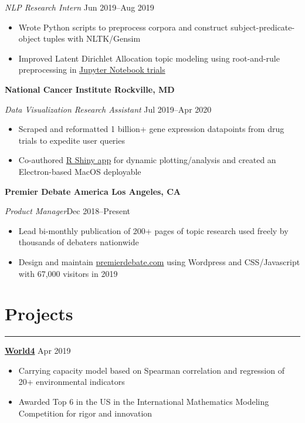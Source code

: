\documentclass[11pt]{article}
\newcommand{\resumesection}[1]{\vspace{-0.3cm}\section*{\color{highlight}#1}\vspace{-0.3cm}\hrule\vspace{0.3cm}}
\begin{document}
\textit{NLP Research Intern} \hfill Jun 2019--Aug 2019
\begin{itemize}
	\item Wrote Python scripts to preprocess corpora and construct subject-predicate-object tuples with NLTK/Gensim
	\item Improved Latent Dirichlet Allocation topic modeling using root-and-rule preprocessing in \href{https://github.com/petezh/RR-NLP-Tools}{Jupyter Notebook trials}
\end{itemize}\vspace{0.1cm}

\textbf{National Cancer Institute \hfill Rockville, MD}\par

\textit{Data Visualization Research Assistant} \hfill Jul 2019--Apr 2020 \par
\begin{itemize}
	\item Scraped and reformatted 1 billion+ gene expression datapoints from drug trials to expedite user queries
	\item Co-authored \href{https://github.com/petezh/TP-Workbench}{R Shiny app} for dynamic plotting/analysis and created an Electron-based MacOS deployable
\end{itemize}

\textbf{Premier Debate America \hfill Los Angeles, CA} \par

\textit{Product Manager}\hfill Dec 2018--Present
\begin{itemize}
	\item Lead bi-monthly publication of 200+ pages of topic research used freely by thousands of debaters nationwide
	\item Design and maintain \href{https://www.premierdebate.com/briefs/}{premierdebate.com} using Wordpress and CSS/Javascript with 67,000 visitors in 2019
\end{itemize}\vspace{0.1cm}


\resumesection{Projects}

\textbf{\href{https://github.com/gautomdas/IMMC-World4/blob/master/US-9365.pdf}{World4}} \hfill Apr 2019\par
\begin{itemize}
	\item Carrying capacity model based on Spearman correlation and regression of 20+ environmental indicators
	\item Awarded Top 6 in the US in the International Mathematics Modeling Competition for rigor and innovation
\end{itemize}\vspace{0.1cm} \par
\end{document}
